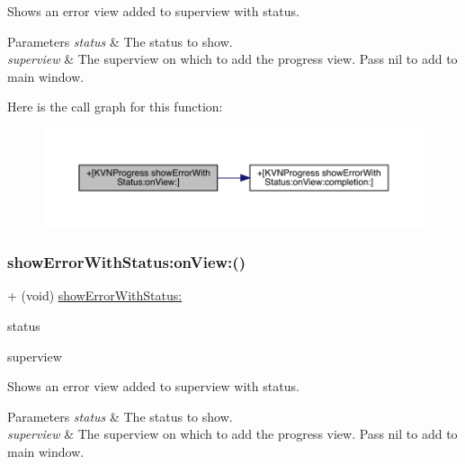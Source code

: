 Shows an error view added to {\ttfamily superview} with {\ttfamily status}. 
\begin{DoxyParams}{Parameters}
{\em status} & The status to show. \\
\hline
{\em superview} & The superview on which to add the progress view. Pass {\ttfamily nil} to add to main window. \\
\hline
\end{DoxyParams}
Here is the call graph for this function\+:\nopagebreak
\begin{figure}[H]
\begin{center}
\leavevmode
\includegraphics[width=350pt]{interface_k_v_n_progress_a639e363838fbea785adea0aa9b39ca39_cgraph}
\end{center}
\end{figure}
\mbox{\label{interface_k_v_n_progress_a639e363838fbea785adea0aa9b39ca39}} 
\subsubsection{\texorpdfstring{show\+Error\+With\+Status\+:on\+View\+:()}{showErrorWithStatus:onView:()}\hspace{0.1cm}{\footnotesize\ttfamily [3/3]}}
{\footnotesize\ttfamily + (void) \mbox{\hyperlink{interface_k_v_n_progress_a3125f228cdd6685e4cf74fa960bfa234}{show\+Error\+With\+Status\+:}} \begin{DoxyParamCaption}\item[{(N\+S\+String $\ast$)}]{status }\item[{onView:(U\+I\+View $\ast$)}]{superview }\end{DoxyParamCaption}}

Shows an error view added to {\ttfamily superview} with {\ttfamily status}. 
\begin{DoxyParams}{Parameters}
{\em status} & The status to show. \\
\hline
{\em superview} & The superview on which to add the progress view. Pass {\ttfamily nil} to add to main window. \\
\hline
\end{DoxyParams}
\mbox{\label{interface_k_v_n_progress_a6cc598f816de8d78d34ab7a9d2216512}} 
